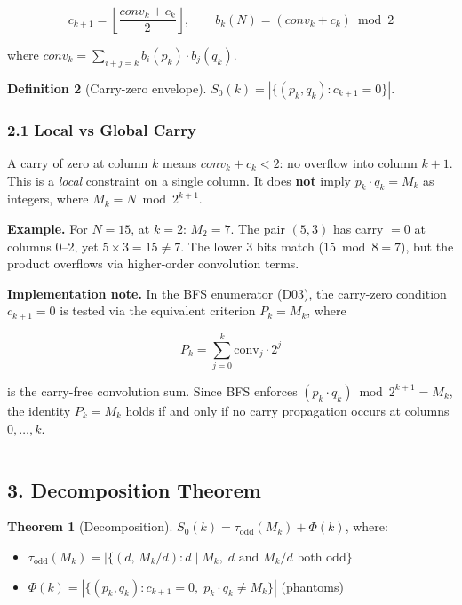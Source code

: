 \documentclass[
  11pt,
]{article}
\providecommand{\tightlist}{%
  \setlength{\itemsep}{0pt}\setlength{\parskip}{0pt}}
\begin{document}
\[c_{k+1} = \left\lfloor \frac{conv_k + c_k}{2} \right\rfloor, \qquad b_k(N) = (conv_k + c_k) \bmod 2\]

where \(conv_k = \sum_{i+j=k} b_i(p_k) \cdot b_j(q_k)\).

\textbf{Definition 2} (Carry-zero envelope).
\(S_0(k) = |\lbrace{}(p_k, q_k) : c_{k+1} = 0\rbrace{}|\).

\subsubsection{2.1 Local vs Global Carry}\label{local-vs-global-carry}

A carry of zero at column \(k\) means \(conv_k + c_k < 2\): no overflow into
column \(k+1\). This is a \emph{local} constraint on a single column. It does
\textbf{not} imply \(p_k \cdot q_k = M_k\) as integers, where
\(M_k = N \bmod 2^{k+1}\).

\textbf{Example.} For \(N = 15\), at \(k = 2\): \(M_2 = 7\). The pair \((5, 3)\)
has carry \(= 0\) at columns 0--2, yet \(5 \times 3 = 15 \neq 7\). The lower 3
bits match (\(15 \bmod 8 = 7\)), but the product overflows via higher-order
convolution terms.

\textbf{Implementation note.} In the BFS enumerator (D03), the carry-zero
condition \(c_{k+1} = 0\) is tested via the equivalent criterion \(P_k = M_k\),
where

\[P_k = \sum_{j=0}^{k} \mathrm{conv}_j \cdot 2^j\]

is the carry-free convolution sum. Since BFS enforces
\((p_k \cdot q_k) \bmod 2^{k+1} = M_k\), the identity \(P_k = M_k\) holds if and
only if no carry propagation occurs at columns \(0, \ldots, k\).

\begin{center}\rule{0.5\linewidth}{0.5pt}\end{center}

\newpage

\subsection{3. Decomposition Theorem}\label{decomposition-theorem}

\textbf{Theorem 1} (Decomposition).
\(S_0(k) = \tau_{\text{odd}}(M_k) + \Phi(k)\), where:

\begin{itemize}
\tightlist
\item
  \(\tau_{\text{odd}}(M_k) = |\lbrace{}(d,\, M_k/d) : d \mid M_k,\; d \text{ and } M_k/d \text{ both odd}\rbrace{}|\)
\item
  \(\Phi(k) = |\lbrace{}(p_k, q_k) : c_{k+1} = 0,\; p_k \cdot q_k \neq M_k\rbrace{}|\)
  (phantoms)
\end{itemize}
\end{document}
